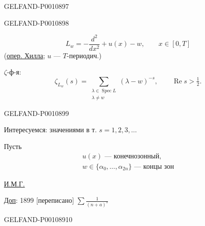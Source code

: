 \begin{GelfandAdjacentEvidence}{GELFAND-P001089}{7}


\medskip
{}
\end{GelfandAdjacentEvidence}
\begin{GelfandAdjacentEvidence}{GELFAND-P001089}{8}

\begin{equation*}
L_w=-\frac{d^2}{dx^2}+u(x)-w,\qquad x\in[0,T]
\tag{1}
\end{equation*}
(\uline{опер. Хилла}; $u$ — $T$-периодич.)

$\zeta$-ф-я:
\begin{equation*}
\zeta_{L_w}(s)=\sum_{\substack{\lambda\in\operatorname{Spec}L\\\lambda\ne w}}
(\lambda-w)^{-s},\qquad \operatorname{Re}s>\tfrac12.
\tag{2}
\end{equation*}
\end{GelfandAdjacentEvidence}
\begin{GelfandAdjacentEvidence}{GELFAND-P001089}{9}


Интересуемся: значениями в т. $s=1,2,3,\ldots$

Пусть
\begin{equation*}
\begin{gathered}
u(x)\text{ — конечнозонный},\\
w\in\{\alpha_0,\ldots,\alpha_{2n}\}\text{ — концы зон}
\end{gathered}
\tag{3}
\end{equation*}

\uline{И.М.Г.}\quad{}

\uline{Доп}:  1899 [переписано]
$\displaystyle\sum\frac{1}{(n+a)^s}$
\end{GelfandAdjacentEvidence}
\begin{GelfandAdjacentEvidence}{GELFAND-P001089}{10}

\end{GelfandAdjacentEvidence}
